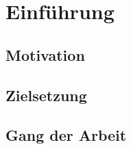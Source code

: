 \chapter{Einführung}
\label{ch:intro}

\section{Motivation}
\label{sec:intro:motivation}

\section{Zielsetzung}
\label{sec:intro:zielsetzung}

\section{Gang der Arbeit}
\label{sec:intro:gangDerArbeit}

